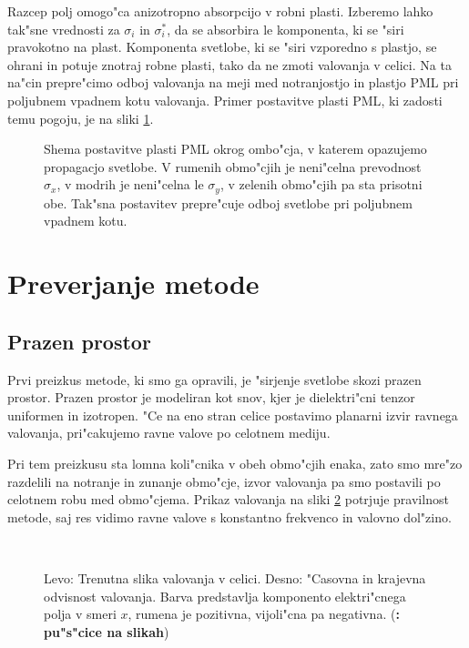 \documentclass[a4paper,10pt]{article}
\newcommand{\todo}[1]{(\textbf{\textsmaller{TODO}: #1})}
\begin{document}
Razcep polj omogo"ca anizotropno absorpcijo v robni plasti. 
Izberemo lahko tak"sne vrednosti za $\sigma_i$ in $\sigma^*_i$, da se absorbira le komponenta, ki se "siri pravokotno na plast. 
Komponenta svetlobe, ki se "siri vzporedno s plastjo, se ohrani in potuje znotraj robne plasti, tako da ne zmoti valovanja v celici. 
Na ta na"cin prepre"cimo odboj valovanja na meji med notranjostjo in plastjo \acs{PML} pri poljubnem vpadnem kotu valovanja. 
Primer postavitve plasti \acs{PML}, ki zadosti temu pogoju, je na sliki \ref{fig:pml-shema}. 

\begin{figure}[!htbp]
 \centering
 \def\svgwidth{.4\textwidth}
 
 \caption{Shema postavitve plasti \acs{PML} okrog ombo"cja, v katerem opazujemo propagacjo svetlobe. V rumenih obmo"cjih je neni"celna prevodnost $\sigma_x$, v modrih je neni"celna le $\sigma_y$, v zelenih obmo"cjih pa sta prisotni obe. Tak"sna postavitev prepre"cuje odboj svetlobe pri poljubnem vpadnem kotu\cite{taflove}. }
 \label{fig:pml-shema}
\end{figure}


\section{Preverjanje metode}

\subsection{Prazen prostor}
Prvi preizkus metode, ki smo ga opravili, je "sirjenje svetlobe skozi prazen prostor. 
Prazen prostor je modeliran kot snov, kjer je dielektri"cni tenzor uniformen in izotropen. 
"Ce na eno stran celice postavimo planarni izvir ravnega valovanja, pri"cakujemo ravne valove po celotnem mediju. 

Pri tem preizkusu sta lomna koli"cnika v obeh obmo"cjih enaka, zato smo mre"zo razdelili na notranje in zunanje obmo"cje, izvor valovanja pa smo postavili po celotnem robu med obmo"cjema. 
Prikaz valovanja na sliki \ref{fig:test-plane} potrjuje pravilnost metode, saj res vidimo ravne valove s konstantno frekvenco in valovno dol"zino. 

\begin{figure}[h]
 \centering
  \,
\caption{Levo: Trenutna slika valovanja v celici. Desno: "Casovna in krajevna odvisnost valovanja. Barva predstavlja komponento elektri"cnega polja v smeri $x$, rumena je pozitivna, vijoli"cna pa negativna. \todo{pu"s"cice na slikah}}
\label{fig:test-plane}
\end{figure}
\end{document}
